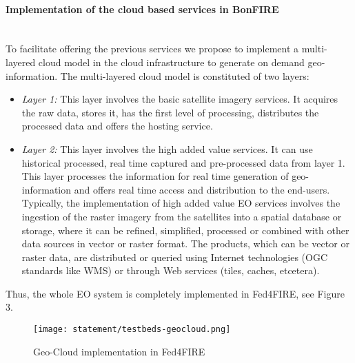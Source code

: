 \paragraph{Implementation of the cloud based services in BonFIRE}~\\
To facilitate offering the previous services we propose to implement a multi-layered cloud model in the \bonfire cloud infrastructure to generate on demand geo-information. The multi-layered cloud model is constituted of two layers:
\begin{itemize}
\item \emph{Layer 1:} This layer involves the basic satellite imagery services.  It acquires the raw data, stores it, has the first level of processing, distributes the processed data and offers the hosting service.

\item \emph{Layer 2:} This layer involves the high added value services. It can use historical processed, real time captured and pre-processed data from layer 1. This layer processes the information for real time generation of geo-information and offers real time access and distribution to the end-users. Typically, the implementation of high added value EO services involves the ingestion of the raster imagery from the satellites into a spatial database or storage, where it can be refined, simplified, processed or combined with other data sources in vector or raster format. The products, which can be vector or raster data, are distributed or queried using Internet technologies (OGC standards like WMS) or through Web services (tiles, caches, etcetera).
\end{itemize}

Thus, the whole EO system is completely implemented in Fed4FIRE, see Figure 3.

\begin{figure}[!h]
\begin{center}
\texttt{[image: statement/testbeds-geocloud.png]}
\caption{Geo-Cloud implementation in Fed4FIRE}
\label{fig:intr-testbeds-geocloud}
\end{center}
\end{figure}




